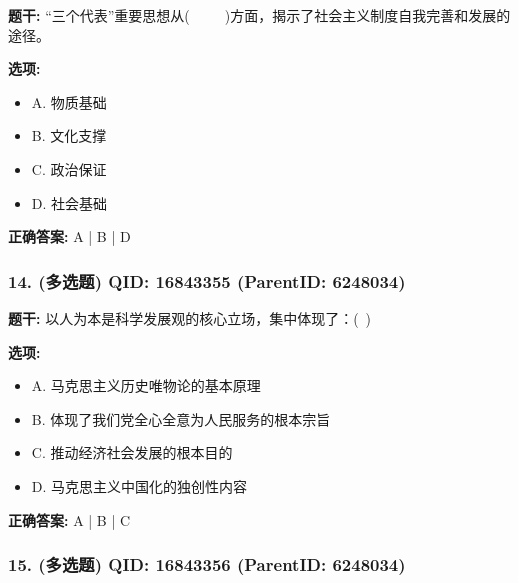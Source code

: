 \documentclass[12pt,UTF8]{ctexart}
\begin{document}
\textbf{题干:}
“三个代表”重要思想从(     )方面，揭示了社会主义制度自我完善和发展的途径。



\textbf{选项:}
\begin{itemize}[leftmargin=*]

  \item A. 物质基础

  \item B. 文化支撑

  \item C. 政治保证

  \item D. 社会基础

\end{itemize}

\textbf{正确答案:}
A | B | D

\vspace{0.3em}\hrulefill\vspace{0.7em}

\subsubsection*{14. (多选题) \small QID: 16843355 (ParentID: 6248034)}

\textbf{题干:}
以人为本是科学发展观的核心立场，集中体现了：( )



\textbf{选项:}
\begin{itemize}[leftmargin=*]

  \item A. 马克思主义历史唯物论的基本原理

  \item B. 体现了我们党全心全意为人民服务的根本宗旨

  \item C. 推动经济社会发展的根本目的

  \item D. 马克思主义中国化的独创性内容

\end{itemize}

\textbf{正确答案:}
A | B | C

\vspace{0.3em}\hrulefill\vspace{0.7em}

\subsubsection*{15. (多选题) \small QID: 16843356 (ParentID: 6248034)}
\end{document}
